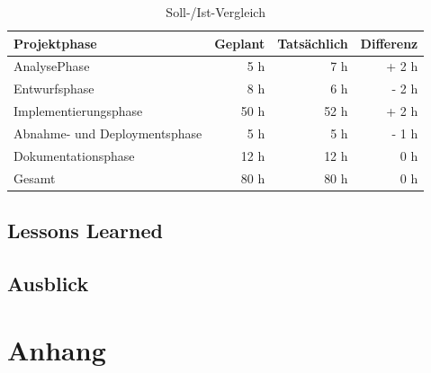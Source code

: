 \documentclass[12pt, ngerman, a4paper,toc=left, parskip=half, numbers=noenddot, headings=standardclasses, nonumberlist]{scrartcl}
\begin{document}
\begin{table}[h]
	\begin{center}
		\begin{tabular}{l r r r}	
			\rowcolor{blue!20}
			Projektphase 				 &Geplant& Tatsächlich & Differenz\\
			\midrule
			AnalysePhase 			      &  5 h &  7 h & + 2 h   \\
			Entwurfsphase   		      &  8 h &  6 h & - 2 h   \\
			Implementierungsphase         & 50 h & 52 h & + 2 h   \\
			Abnahme- und Deploymentsphase &  5 h &  5 h & - 1 h	  \\
			Dokumentationsphase			  & 12 h & 12 h & 	0 h   \\
			\midrule
			Gesamt						  & 80 h & 80 h &   0 h   \\
		\end{tabular}
	\end{center}
	\caption{Soll-/Ist-Vergleich}
	\label{table:4}
\end{table}

\subsection{Lessons Learned}

\subsection{Ausblick}

\newpage
{}


\newpage
\appendix
\section{Anhang}
\end{document}

